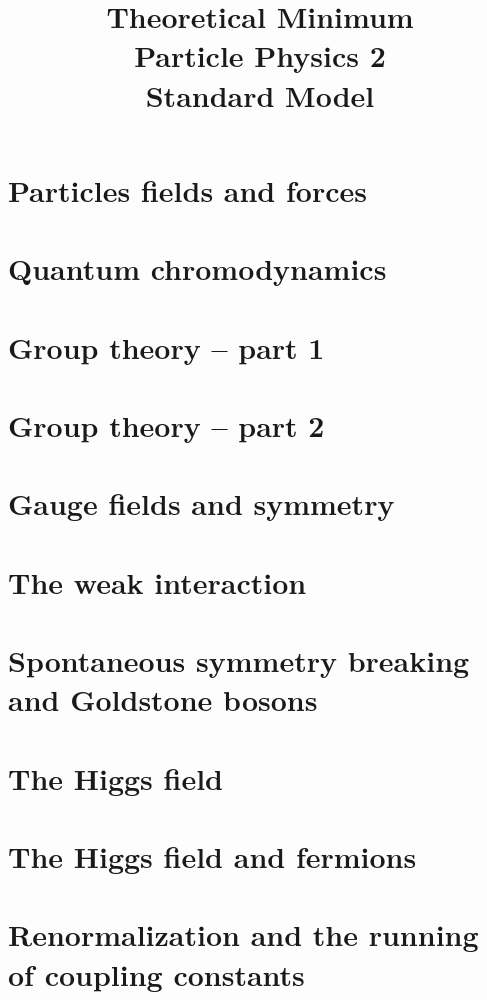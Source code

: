 \documentclass[]{article}
\title{Theoretical Minimum\\Particle Physics 2\\Standard Model}
\author{}
\begin{document}
\maketitle

\begin{abstract}

\end{abstract}

\section{Particles fields and forces}
\section{Quantum chromodynamics}
\section{Group theory – part 1}
\section{Group theory – part 2}
\section{Gauge fields and symmetry}
\section{The weak interaction}
\section{Spontaneous symmetry breaking and Goldstone bosons}
\section{The Higgs field}
\section{The Higgs field and fermions}
\section{Renormalization and the running of coupling constants}
\end{document}
